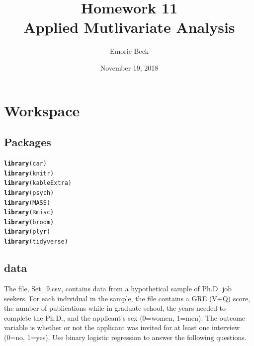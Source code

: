 \documentclass{article}\usepackage[]{graphicx}\usepackage[]{color}
\title{%
Homework 11\\
\large Applied Mutlivariate Analysis}
\date{November 19, 2018}
\author{Emorie Beck}
\makeatletter
\newcommand{\hlstd}[1]{\textcolor[rgb]{0.345,0.345,0.345}{#1}}%
\newcommand{\hlkwd}[1]{\textcolor[rgb]{0.737,0.353,0.396}{\textbf{#1}}}%
\newenvironment{kframe}{%
 \def\at@end@of@kframe{}%
 \ifinner\ifhmode%
  \def\at@end@of@kframe{\end{minipage}}%
  \begin{minipage}{\columnwidth}%
 \fi\fi%
 \def\FrameCommand##1{\hskip\@totalleftmargin \hskip-\fboxsep
 \colorbox{shadecolor}{##1}\hskip-\fboxsep
     \hskip-\linewidth \hskip-\@totalleftmargin \hskip\columnwidth}%
 \MakeFramed {\advance\hsize-\width
   \@totalleftmargin\z@ \linewidth\hsize
   \@setminipage}}%
 {\par\unskip\endMakeFramed%
 \at@end@of@kframe}
\newenvironment{knitrout}{}{} %
\makeatother
\begin{document}
\maketitle

\section{Workspace}
\subsection{Packages}



\begin{knitrout}
\color{fgcolor}\begin{kframe}
\begin{alltt}
\hlkwd{library}\hlstd{(car)}
\hlkwd{library}\hlstd{(knitr)}
\hlkwd{library}\hlstd{(kableExtra)}
\hlkwd{library}\hlstd{(psych)}
\hlkwd{library}\hlstd{(MASS)}
\hlkwd{library}\hlstd{(Rmisc)}
\hlkwd{library}\hlstd{(broom)}
\hlkwd{library}\hlstd{(plyr)}
\hlkwd{library}\hlstd{(tidyverse)}
\end{alltt}
\end{kframe}
\end{knitrout}



\subsection{data}
The file, Set\_9.csv, contains data from a hypothetical sample of Ph.D. job seekers. For each individual in the sample, the file contains a GRE (V+Q) score, the number of publications while in graduate school, the years needed to complete the Ph.D., and the applicant’s sex (0=women, 1=men). The outcome variable is whether or not the applicant was invited for at least one interview (0=no, 1=yes). Use binary logistic regression to answer the following questions.
\end{document}
